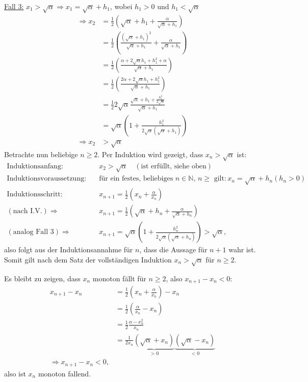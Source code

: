 \begin{lsg}
\noindent
\underline{Fall 3:} $x_1 > \sqrt{\alpha} \Rightarrow x_1 = \sqrt{\alpha} + h_1$, wobei $h_1 > 0$ und $h_1 < \sqrt\alpha$
\begin{align*}
\Rightarrow x_2 &= \frac{1}{2} \left( \sqrt{\alpha} + h_1 + \frac{\alpha}{\sqrt{\alpha} + h_1} \right) \\
& = \frac{1}{2} \left(\frac{\left(\sqrt{\alpha} + h_1\right)^2}{\sqrt{\alpha} + h_1} + \frac{\alpha}{\sqrt{\alpha} + h_1} \right) \\
&= \frac{1}{2} \left(\frac{\alpha + 2\sqrt{\alpha} h_1 + h_1^2 + \alpha}{\sqrt{\alpha} + h_1} \right) \\
&= \frac{1}{2} \left(\frac{2\alpha + 2\sqrt{\alpha} h_1 + h_1^2}{\sqrt{\alpha} + h_1} \right) \\
&= \frac{1}{2} 2\sqrt{\alpha} \frac{\sqrt{\alpha} + h_1 + \frac{h_1^2}{2\sqrt{\alpha}}}{\sqrt{\alpha} + h_1} \\
&= \sqrt{\alpha} \left(1 + \frac{h_1^2}{2\sqrt{\alpha}\left(\sqrt{\alpha} + h_1\right)}\right) \\
\Rightarrow x_2 &> \sqrt{\alpha}
\end{align*}
Betrachte nun beliebige $n \geq 2$. Per Induktion wird gezeigt, dass $x_n > \sqrt{\alpha}$ ist:
\begin{align*}
    \text{Induktionsanfang:}&\quad x_2 > \sqrt{\alpha} \quad(\text{ist erfüllt, siehe oben}) \\
    \text{Induktionsvoraussetzung:} & \quad \text{für ein festes, beliebiges $n \in \mathbb{N}$, $n \geq$ gilt:}\, x_n = \sqrt{\alpha} + h_n (h_n > 0) \\
    \text{Induktionsschritt:}&\quad x_{n+1} = \frac12\left(x_n + \frac{\alpha}{x_n}\right) \\
    (\text{nach I.V.})\Rightarrow&\quad x_{n+1}= \frac12\left(\sqrt{\alpha} + h_n + \frac{\alpha}{\sqrt{\alpha} + h_n}\right) \\
    (\text{analog Fall 3})\Rightarrow&\quad x_{n+1} = \sqrt{\alpha} \left(1 + \frac{h_n^2}{2\sqrt{\alpha}\left(\sqrt{\alpha} + h_n\right)}\right) > \sqrt{\alpha},
\end{align*}
also folgt aus der Induktionsannahme für $n$, dass die Aussage für $n+1$ wahr ist. Somit gilt nach dem Satz der vollständigen Induktion $x_n > \sqrt{\alpha}$ für $n\geq 2$.

Es bleibt zu zeigen, dass $x_n$ monoton fällt für $n\geq 2$, also $x_{n+1} - x_n < 0$:
\begin{align*}
    x_{n+1} - x_n &= \frac12\left(x_n + \frac{\alpha}{x_n}\right) -x_n\\
    &= \frac12\left(\frac{\alpha}{x_n} - x_n\right) \\
    &= \frac12\frac{\alpha - x_n^2}{x_n} \\
    &= \frac{1}{2 x_n} \underbrace{\left(\sqrt{\alpha} + x_n\right)}_{>0} \underbrace{\left(\sqrt{\alpha} - x_n\right)}_{<0} \\
    \Rightarrow x_{n+1} - x_n < 0,
\end{align*}
also ist $x_n$ monoton fallend.


\end{lsg}
